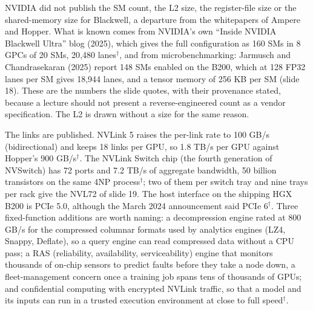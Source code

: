 \documentclass[11pt,letterpaper]{article}
\begin{document}
NVIDIA did not publish the SM count, the L2 size, the register-file size or the shared-memory size for Blackwell, a departure from the whitepapers of Ampere and Hopper. What is known comes from NVIDIA's own ``Inside NVIDIA Blackwell Ultra'' blog (2025), which gives the full configuration as 160 SMs in 8 GPCs of 20 SMs, 20{,}480 lanes$^\dagger$, and from microbenchmarking: Jarmusch and Chandrasekaran (2025) report 148 SMs enabled on the B200, which at 128 FP32 lanes per SM gives 18{,}944 lanes, and a tensor memory of 256 KB per SM (slide 18). These are the numbers the slide quotes, with their provenance stated, because a lecture should not present a reverse-engineered count as a vendor specification. The L2 is drawn without a size for the same reason.

The links are published. NVLink 5 raises the per-link rate to 100 GB/s (bidirectional) and keeps 18 links per GPU, so 1.8 TB/s per GPU against Hopper's 900 GB/s$^\dagger$. The NVLink Switch chip (the fourth generation of NVSwitch) has 72 ports and 7.2 TB/s of aggregate bandwidth, 50 billion transistors on the same 4NP process$^\dagger$; two of them per switch tray and nine trays per rack give the NVL72 of slide 19. The host interface on the shipping HGX B200 is PCIe 5.0, although the March 2024 announcement said PCIe 6$^\dagger$. Three fixed-function additions are worth naming: a decompression engine rated at 800 GB/s for the compressed columnar formats used by analytics engines (LZ4, Snappy, Deflate), so a query engine can read compressed data without a CPU pass; a RAS (reliability, availability, serviceability) engine that monitors thousands of on-chip sensors to predict faults before they take a node down, a fleet-management concern once a training job spans tens of thousands of GPUs; and confidential computing with encrypted NVLink traffic, so that a model and its inputs can run in a trusted execution environment at close to full speed$^\dagger$.
\end{document}
